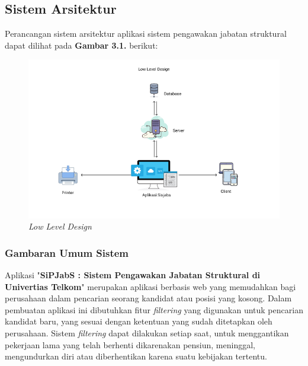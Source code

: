 \chapter{\babTiga}

\section{Sistem Arsitektur}

Perancangan sistem arsitektur aplikasi sistem pengawakan jabatan struktural dapat dilihat pada \textbf{Gambar 3.1.} berikut: 

\begin{figure}
	\centering
	\includegraphics[width=1\textwidth]
	{pics/LowLevelDiagram.png}
	\caption{\textit{Low Level Design}}
	\label{fig:31}
\end{figure}


\subsection{Gambaran Umum Sistem}

Aplikasi "\textbf{SiPJabS : Sistem Pengawakan Jabatan Struktural di Univertias Telkom}" merupakan aplikasi berbasis web yang memudahkan bagi perusahaan dalam pencarian seorang kandidat atau posisi yang kosong. Dalam pembuatan aplikasi ini dibutuhkan fitur \textit{filtering} yang digunakan untuk pencarian kandidat baru, yang sesuai dengan ketentuan yang sudah ditetapkan oleh perusahaan. Sistem \textit{filtering} dapat dilakukan setiap saat, untuk menggantikan pekerjaan lama yang telah berhenti dikarenakan pensiun, meninggal, mengundurkan diri atau diberhentikan karena suatu kebijakan tertentu. \\

